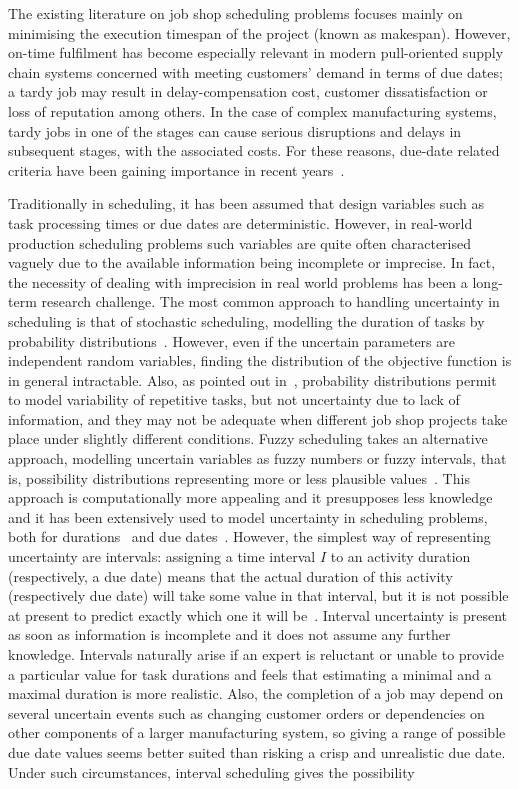 \documentclass[12pt,halfline,a4paper]{ouparticle}
\begin{document}
The existing literature on job shop scheduling problems focuses mainly on minimising the execution timespan of the project (known as makespan). However, on-time fulfilment has become especially relevant in modern pull-oriented supply chain systems concerned with meeting customers' demand in terms of due dates; a tardy job may result in delay-compensation cost, customer dissatisfaction or loss of reputation among others. In the case of complex manufacturing systems, tardy jobs in one of the stages can cause serious disruptions and delays in subsequent stages, with the associated costs. For these reasons, due-date related criteria have been gaining importance in recent years~\cite{Lohmer2020,Mou2017}.

Traditionally in scheduling, it has been assumed that design variables such as task processing times or due dates are deterministic. However, in real-world production scheduling problems such variables are quite often characterised vaguely due to the available information being incomplete or imprecise. In fact, the necessity of dealing with imprecision in real world problems has been a long-term research challenge. The most common approach to handling uncertainty in scheduling is that of stochastic scheduling, modelling the duration of tasks by probability distributions~\cite{Pinedo2016}. However, even if the uncertain parameters are independent random variables, finding the distribution of the objective function is in general intractable. Also, as pointed out in~\cite{Dubois1996b}, probability distributions permit to model variability of repetitive tasks, but not uncertainty due to lack of information, and they may not be adequate when different job shop projects take place under slightly different conditions. Fuzzy scheduling takes an alternative approach, modelling uncertain variables as fuzzy numbers or fuzzy intervals, that is, possibility distributions representing more or less plausible values~\cite{Dubois2003}. This approach is computationally more appealing and it presupposes less knowledge and it has been extensively used to model uncertainty in scheduling problems, both for durations~\cite{Behnamian2016} and due dates~\cite{Chanas2003}. However, the simplest way of representing uncertainty are intervals: assigning a time interval $I$ to an activity duration (respectively, a due date) means that the actual duration of this activity (respectively due date) will take some value in that interval, but it is not possible at present to predict exactly which one it will be~\cite{Fortin2010}.  Interval uncertainty is present as soon as information is incomplete and it does not assume any further knowledge.  Intervals naturally arise if an expert is reluctant or unable to provide a particular value for task durations and feels that estimating a minimal and a maximal duration is more realistic. Also, the completion of a job may depend on several uncertain events such as changing customer orders or dependencies on other components of a larger manufacturing system, so giving a range of possible due date values seems better suited than risking a crisp and unrealistic due date.  Under such circumstances, interval scheduling gives the possibility 
\end{document}
